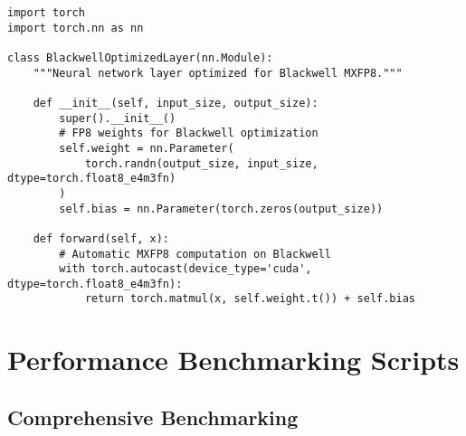 \documentclass[11pt,a4paper]{article}
\begin{document}
\begin{lstlisting}[caption=Blackwell MXFP8 Matrix Multiplication]
import torch
import torch.nn as nn

class BlackwellOptimizedLayer(nn.Module):
    """Neural network layer optimized for Blackwell MXFP8."""

    def __init__(self, input_size, output_size):
        super().__init__()
        # FP8 weights for Blackwell optimization
        self.weight = nn.Parameter(
            torch.randn(output_size, input_size, dtype=torch.float8_e4m3fn)
        )
        self.bias = nn.Parameter(torch.zeros(output_size))

    def forward(self, x):
        # Automatic MXFP8 computation on Blackwell
        with torch.autocast(device_type='cuda', dtype=torch.float8_e4m3fn):
            return torch.matmul(x, self.weight.t()) + self.bias
\end{lstlisting}

\section{Performance Benchmarking Scripts}

\subsection{Comprehensive Benchmarking}
\end{document}
